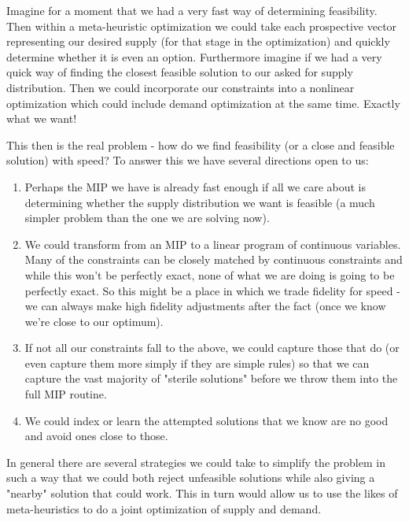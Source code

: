 \documentclass[10pt,a5paper]{book}
\begin{document}
Imagine for a moment that we had a very fast way of determining feasibility. Then within a meta-heuristic optimization we could take each prospective vector representing our desired supply (for that stage in the optimization) and quickly determine whether it is even an option. Furthermore imagine if we had a very quick way of finding the closest feasible solution to our asked for supply distribution. Then we could incorporate our constraints into a nonlinear optimization which could include demand optimization at the same time. Exactly what we want!

This then is the real problem - how do we find feasibility (or a close and feasible solution) with speed? To answer this we have several directions open to us:
\begin{enumerate}
\item Perhaps the MIP we have is already fast enough if all we care about is determining whether the supply distribution we want is feasible (a much simpler problem than the one we are solving now).
\item We could transform from an MIP to a linear program of continuous variables. Many of the constraints can be closely matched by continuous constraints and while this won't be perfectly exact, none of what we are doing is going to be perfectly exact. So this might be a place in which we trade fidelity for speed - we can always make high fidelity adjustments after the fact (once we know we're close to our optimum). 
\item If not all our constraints fall to the above, we could capture those that do (or even capture them more simply if they are simple rules) so that we can capture the vast majority of "sterile solutions" before we throw them into the full MIP routine. 
\item We could index or learn the attempted solutions that we know are no good and avoid ones close to those. 
\end{enumerate}

In general there are several strategies we could take to simplify the problem in such a way that we could both reject unfeasible solutions while also giving a "nearby" solution that could work. This in turn would allow us to use the likes of meta-heuristics to do a joint optimization of supply and demand. 
\end{document}
